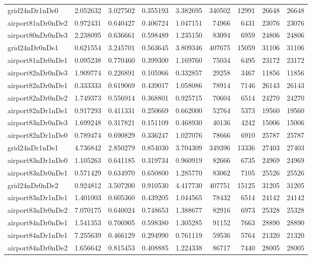 \begin{longtable}{|l|r|r|r|r|r|r|r|r|}
grid24nDr1nDe0 & 2.052632 & 3.027502 & 0.355193 & 3.382695 & 340502 & 12991 & 26648 & 26648 \\
airport81nDr0nDe2 & 0.972431 & 0.640427 & 0.406724 & 1.047151 & 74966 & 6431 & 23076 & 23076 \\
airport80nDr0nDe3 & 2.238095 & 0.636661 & 0.598489 & 1.235150 & 83094 & 6959 & 24806 & 24806 \\
grid24nDr0nDe1 & 0.621554 & 3.245701 & 0.563645 & 3.809346 & 407675 & 15059 & 31106 & 31106 \\
airport81nDr0nDe1 & 0.095238 & 0.770460 & 0.399300 & 1.169760 & 75034 & 6495 & 23172 & 23172 \\
airport82nDr0nDe3 & 1.909774 & 0.226891 & 0.105966 & 0.332857 & 29258 & 3467 & 11856 & 11856 \\
airport82nDr0nDe1 & 0.333333 & 0.619069 & 0.439017 & 1.058086 & 78914 & 7146 & 26143 & 26143 \\
airport82nDr0nDe2 & 1.749373 & 0.556914 & 0.368801 & 0.925715 & 70604 & 6514 & 24270 & 24270 \\
airport82nDr1nDe1 & 0.917293 & 0.411331 & 0.250669 & 0.662000 & 52764 & 5373 & 19560 & 19560 \\
airport83nDr0nDe3 & 1.699248 & 0.317821 & 0.151109 & 0.468930 & 40136 & 4242 & 15006 & 15006 \\
airport82nDr1nDe0 & 0.789474 & 0.690829 & 0.336247 & 1.027076 & 78666 & 6910 & 25787 & 25787 \\
grid24nDr1nDe1 & 4.736842 & 2.850279 & 0.854030 & 3.704309 & 349396 & 13336 & 27403 & 27403 \\
airport83nDr1nDe0 & 1.105263 & 0.641185 & 0.319734 & 0.960919 & 82666 & 6735 & 24969 & 24969 \\
airport83nDr0nDe1 & 0.571429 & 0.634970 & 0.650800 & 1.285770 & 83062 & 7105 & 25526 & 25526 \\
grid24nDr0nDe2 & 0.924812 & 3.507200 & 0.910530 & 4.417730 & 407751 & 15125 & 31205 & 31205 \\
airport83nDr1nDe1 & 1.401003 & 0.605360 & 0.439205 & 1.044565 & 78432 & 6514 & 24142 & 24142 \\
airport83nDr0nDe2 & 7.070175 & 0.640024 & 0.748653 & 1.388677 & 82916 & 6973 & 25328 & 25328 \\
airport84nDr0nDe1 & 1.541353 & 0.706905 & 0.598380 & 1.305285 & 91152 & 7663 & 28890 & 28890 \\
airport84nDr1nDe1 & 7.255639 & 0.466129 & 0.294990 & 0.761119 & 59536 & 5764 & 21320 & 21320 \\
airport84nDr0nDe2 & 1.656642 & 0.815453 & 0.408885 & 1.224338 & 86717 & 7440 & 28005 & 28005 \\

\end{longtable}
